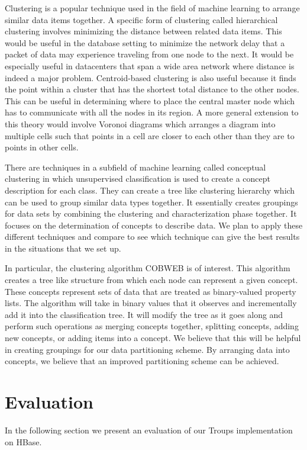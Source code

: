 \documentclass[10pt,final,journal]{IEEEtran}
\begin{document}
Clustering is a popular technique used in the field of machine learning to arrange similar data items together.  A specific form of clustering called hierarchical clustering involves minimizing the distance between related data items.  This would be useful in the database setting to minimize the network delay that a packet of data may experience traveling from one node to the next.  It would be especially useful in datacenters that span a wide area network where distance is indeed a major problem.  Centroid-based clustering is also useful because it finds the point within a cluster that has the shortest total distance to the other nodes.  This can be useful in determining where to place the central master node which has to communicate with all the nodes in its region.  A more general extension to this theory would involve Voronoi diagrams which arranges a diagram into multiple cells such that points in a cell are closer to each other than they are to points in other cells.

There are techniques in a subfield of machine learning called conceptual clustering in which unsupervised classification is used to create a concept description for each class. They can create a tree like clustering hierarchy which can be used to group similar data types together. It essentially creates groupings for data sets by combining the clustering and characterization phase together. It focuses on the determination of concepts to describe data. We plan to apply these different techniques and compare to see which technique can give the best results in the situations that we set up.

In particular, the clustering algorithm COBWEB is of interest. This algorithm creates a tree like structure from which each node can represent a given concept. These concepts represent sets of data that are treated as binary-valued property lists. The algorithm will take in binary values that it observes and incrementally add it into the classification tree. It will modify the tree as it goes along and perform such operations as merging concepts together, splitting concepts, adding new concepts, or adding items into a concept. We believe that this will be helpful in creating groupings for our data partitioning scheme. By arranging data into concepts, we believe that an improved partitioning scheme can be achieved.


\section{Evaluation}
In the following section we present an evaluation of our Troups implementation on HBase.
\end{document}
